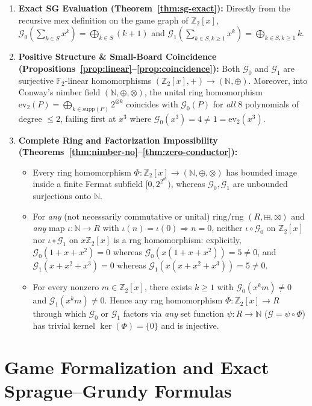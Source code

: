 \documentclass[11pt,a4paper]{article}
\theoremstyle{definition}
\newcommand{\F}{\mathbb{F}}
\newcommand{\Z}{\mathbb{Z}}
\newcommand{\N}{\mathbb{N}}
\newcommand{\SG}{\mathcal{G}}
\newcommand{\mex}{\mathrm{mex}}
\newcommand{\supp}{\mathrm{supp}}
\newcommand{\ev}{\mathrm{ev}}
\begin{document}
\begin{enumerate}
  \setlength{\itemsep}{2pt}
  \item \textbf{Exact SG Evaluation (Theorem~\ref{thm:sg-exact}):} Directly from the
    recursive $\mex$ definition on the game graph of $\Z_2[x]$,
    $\SG_0(\sum_{k\in S} x^k) = \bigoplus_{k\in S}(k+1)$ and
    $\SG_1(\sum_{k\in S, k\ge 1} x^k) = \bigoplus_{k\in S, k\ge 1} k$.
  \item \textbf{Positive Structure \& Small-Board Coincidence
    (Propositions~\ref{prop:linear}--\ref{prop:coincidence}):} Both $\SG_0$ and $\SG_1$
    are surjective $\F_2$-linear homomorphisms $(\Z_2[x],+) \to (\N,\oplus)$. Moreover,
    into Conway's nimber field $(\N,\oplus,\otimes)$, the unital ring homomorphism
    $\ev_2(P) = \bigoplus_{k\in\supp(P)} 2^{\otimes k}$ coincides with $\SG_0(P)$ for
    \emph{all} $8$ polynomials of degree $\le 2$, failing first at $x^3$ where
    $\SG_0(x^3) = 4 \neq 1 = \ev_2(x^3)$.
  \item \textbf{Complete Ring and Factorization Impossibility
    (Theorems~\ref{thm:nimber-no}--\ref{thm:zero-conductor}):}
    \begin{itemize}
      \setlength{\itemsep}{1pt}
      \item Every ring homomorphism $\Phi : \Z_2[x] \to (\N,\oplus,\otimes)$ has bounded
        image inside a finite Fermat subfield $[0,2^{2^m})$, whereas $\SG_0,\SG_1$ are
        unbounded surjections onto $\N$.
      \item For \emph{any} (not necessarily commutative or unital) ring/rng
        $(R,\boxplus,\boxtimes)$ and \emph{any} map $\iota : \N \to R$ with
        $\iota(n)=\iota(0)\Rightarrow n=0$, neither $\iota \circ \SG_0$ on $\Z_2[x]$ nor
        $\iota \circ \SG_1$ on $x\Z_2[x]$ is a rng homomorphism: explicitly,
        $\SG_0(1+x+x^2)=0$ whereas $\SG_0(x(1+x+x^2))=5\neq 0$, and
        $\SG_1(x+x^2+x^3)=0$ whereas $\SG_1(x(x+x^2+x^3))=5\neq 0$.
      \item For every nonzero $m \in \Z_2[x]$, there exists $k \ge 1$ with
        $\SG_0(x^k m) \neq 0$ and $\SG_1(x^k m) \neq 0$. Hence any rng homomorphism
        $\Phi : \Z_2[x] \to R$ through which $\SG_0$ or $\SG_1$ factors via \emph{any}
        set function $\psi : R \to \N$ ($\SG = \psi \circ \Phi$) has trivial kernel
        $\ker(\Phi)=\{0\}$ and is injective.
    \end{itemize}
\end{enumerate}

\section{Game Formalization and Exact Sprague--Grundy Formulas}
\end{document}
